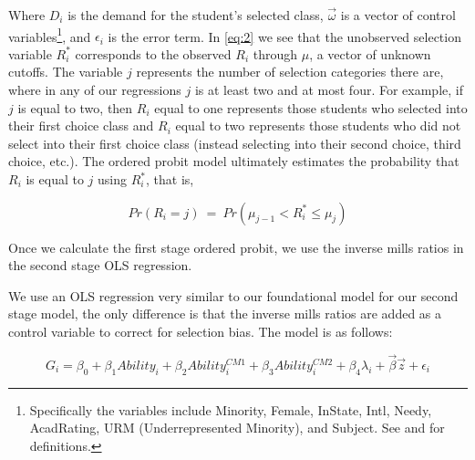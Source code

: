 Where $D_{i}$ is the demand for the student's selected class, $\overrightarrow{\omega}$ is a vector of control variables\footnote{Specifically the variables include Minority, Female, InState, Intl, Needy, AcadRating, URM (Underrepresented Minority), and Subject. See  and  for definitions.}, and $\epsilon_{i}$ is the error term. 
In \eqref{eq:2} we see that the unobserved selection variable $R_{i}^{*}$ corresponds to the observed $R_{i}$ through $\mu$, a vector of unknown cutoffs. 
The variable $j$ represents the number of selection categories there are, where in any of our regressions $j$ is at least two and at most four. 
For example, if $j$ is equal to two, then $R_{i}$ equal to one represents those students who selected into their first choice class and $R_{i}$ equal to two represents those students who did not select into their first choice class (instead selecting into their second choice, third choice, etc.). 
The ordered probit model ultimately estimates the probability that $R_{i}$ is equal to $j$ using $R_{i}^{*}$, that is, 

\setlength{\belowdisplayskip}{5pt} \setlength{\belowdisplayshortskip}{1pt}
\setlength{\abovedisplayskip}{-4pt} \setlength{\abovedisplayshortskip}{1pt}

\begin{equation}\label{eq:3}
Pr(R_{i} = j) \ = \ Pr(\mu_{j-1} < R_{i}^{*} \leq \mu_{j})
\end{equation}

\noindent Once we calculate the first stage ordered probit, we use the inverse mills ratios in the second stage OLS regression.

We use an OLS regression very similar to our foundational model for our second stage model, the only difference is that the inverse mills ratios are added as a control variable to correct for selection bias. The model is as follows:

\begin{equation}\label{eq:4}
G_{i} = \beta_{0} + \beta_{1} Ability_{i} + \beta_{2} Ability_{i}^{CM1} + \beta_{3} Ability_{i}^{CM2} + \beta_{4} \lambda_{i} + \overrightarrow{\beta} \overrightarrow{z} + \epsilon_{i}
\end{equation}

